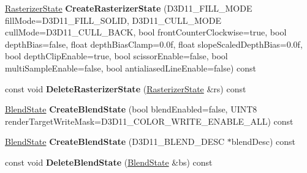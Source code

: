\begin{DoxyCompactItemize}
\item 
\hyperlink{struct_ensum_1_1_graphics_1_1_rasterizer_state}{Rasterizer\+State} {\bfseries Create\+Rasterizer\+State} (D3\+D11\+\_\+\+F\+I\+L\+L\+\_\+\+M\+O\+DE fill\+Mode=D3\+D11\+\_\+\+F\+I\+L\+L\+\_\+\+S\+O\+L\+ID, D3\+D11\+\_\+\+C\+U\+L\+L\+\_\+\+M\+O\+DE cull\+Mode=D3\+D11\+\_\+\+C\+U\+L\+L\+\_\+\+B\+A\+CK, bool front\+Counter\+Clockwise=true, bool depth\+Bias=false, float depth\+Bias\+Clamp=0.\+0f, float slope\+Scaled\+Depth\+Bias=0.\+0f, bool depth\+Clip\+Enable=true, bool scissor\+Enable=false, bool multi\+Sample\+Enable=false, bool antialiased\+Line\+Enable=false) const \hypertarget{class_ensum_1_1_graphics_1_1_direct3_d11_a06450d57a4aaf75d607573e202db8558}{}\label{class_ensum_1_1_graphics_1_1_direct3_d11_a06450d57a4aaf75d607573e202db8558}

\item 
const void {\bfseries Delete\+Rasterizer\+State} (\hyperlink{struct_ensum_1_1_graphics_1_1_rasterizer_state}{Rasterizer\+State} \&rs) const \hypertarget{class_ensum_1_1_graphics_1_1_direct3_d11_a51740626ccbd753381c2a2d0120a9b72}{}\label{class_ensum_1_1_graphics_1_1_direct3_d11_a51740626ccbd753381c2a2d0120a9b72}

\item 
\hyperlink{struct_ensum_1_1_graphics_1_1_blend_state}{Blend\+State} {\bfseries Create\+Blend\+State} (bool blend\+Enabled=false, U\+I\+N\+T8 render\+Target\+Write\+Mask=D3\+D11\+\_\+\+C\+O\+L\+O\+R\+\_\+\+W\+R\+I\+T\+E\+\_\+\+E\+N\+A\+B\+L\+E\+\_\+\+A\+LL) const \hypertarget{class_ensum_1_1_graphics_1_1_direct3_d11_ad84a4a23abd2e3c05cdd87955fdbba3d}{}\label{class_ensum_1_1_graphics_1_1_direct3_d11_ad84a4a23abd2e3c05cdd87955fdbba3d}

\item 
\hyperlink{struct_ensum_1_1_graphics_1_1_blend_state}{Blend\+State} {\bfseries Create\+Blend\+State} (D3\+D11\+\_\+\+B\+L\+E\+N\+D\+\_\+\+D\+E\+SC $\ast$blend\+Desc) const \hypertarget{class_ensum_1_1_graphics_1_1_direct3_d11_a60305dc183f6c5994e6d14db88999f94}{}\label{class_ensum_1_1_graphics_1_1_direct3_d11_a60305dc183f6c5994e6d14db88999f94}

\item 
const void {\bfseries Delete\+Blend\+State} (\hyperlink{struct_ensum_1_1_graphics_1_1_blend_state}{Blend\+State} \&bs) const \hypertarget{class_ensum_1_1_graphics_1_1_direct3_d11_a0274aa6937f2da786cdac2f039771f15}{}\label{class_ensum_1_1_graphics_1_1_direct3_d11_a0274aa6937f2da786cdac2f039771f15}

\end{DoxyCompactItemize}
